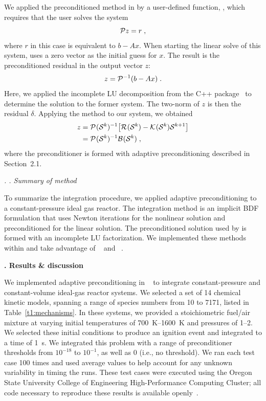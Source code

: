 \documentclass[twocolumn,10pt]{article}
\renewcommand{\section}%
              [1]%
              {%
               \bgroup%
               \flushleft%
               \small\bf%
               \stepcounter{section}%
               \arabic{section}. #1%
               \par%
               \egroup%
              }%
\renewcommand{\subsection}%
              [1]%
              {%
               \bgroup%
               \flushleft%
               \small\em%
               \stepcounter{subsection}%
               \arabic{section}.%
               \arabic{subsection}. #1%
               \par%
               \egroup%
              }%
\newcommand{\sectionOne}[1]{\section{#1} \addvspace{10pt}}
\newcommand{\sectionTwo}[1]{\subsection{#1} \addvspace{10pt}}
\newcommand{\revised}[2]{#1}  %
\begin{document}
We applied the preconditioned \gmres{} method in \cvodes{} by a user-defined function, \psolve{}, which requires that the user solves the system
\begin{equation}
    \mathcal{P}{}z = r \;,
\end{equation}
where $r$ in this case is equivalent to $b-Ax$. \revised{When starting the linear solve of this system, \cvodes{} uses a zero vector as the initial guess for $x$.}{revOne}
The result is the preconditioned residual in the output vector $z$:
\begin{equation}
    z =\mathcal{P}{}^{-1}(b-Ax) \;.
\end{equation}
Here, we applied the incomplete LU decomposition from the \eigen{} C++ package~\cite{guennebaud_eigen_2010} to determine the solution to the former system.
The two-norm of $z$ is then the residual $\delta$.
Applying the \cvodes{} method to our system, we obtained
\begin{align}
    z &= \mathcal{P}^{}(\mathcal{S}^{k})^{-1}\big[\mathcal{R}^{}(\mathcal{S}{}^{k})-\mathcal{K}^{}(\mathcal{S}{}^{k})\mathcal{S}{}^{k+1}\big] \nonumber \\
    &= \mathcal{P}^{}(\mathcal{S}^{k})^{-1}\mathcal{B}^{}(\mathcal{S}{}^{k}) \;,
\end{align}
where the preconditioner is formed with adaptive preconditioning described in \revised{Section~2.1}{editor}. 

\sectionTwo{Summary of method}

To summarize the integration procedure, we applied adaptive preconditioning to a constant-pressure ideal gas reactor.
The integration method is an implicit BDF formulation that uses Newton iterations for the nonlinear solution and preconditioned \gmres{} for the linear solution.
The preconditioned solution used by \gmres{} is formed with an incomplete LU factorization.
We implemented these methods within \cantera{} and take advantage of \sundials{}~\cite{hindmarsh_sundials_2005} and \eigen{}~\cite{guennebaud_eigen_2010}.

\sectionOne{Results \& discussion}

We implemented adaptive preconditioning in \cantera{}~\cite{cantera} to integrate \revised{constant-pressure and constant-volume}{revOne} ideal-gas reactor systems.
We selected a set of 14 chemical kinetic models, spanning a range of species numbers from 10 to 7171, listed in Table~\ref{t1:mechanisms}.
\revised{In these systems, we provided a stoichiometric fuel/air mixture at varying initial temperatures of \SIrange{700}{1600}{\kelvin} and pressures of \SIrange{1}{2}{\atm}.}{generalColor}
We selected these initial conditions to produce an ignition event and integrated to a time of \SI{1}{\second}.
We integrated this problem with a range of preconditioner thresholds from $10^{-18}$ to $10^{-1}$, as well as 0 (i.e., no threshold).
We ran each test case 100 times and used average values to help account for any unknown variability in timing the runs.
These test cases were executed using the Oregon State University College of Engineering High-Performance Computing Cluster; all code necessary to reproduce these results is available openly~\cite{testing_package}.
\end{document}
